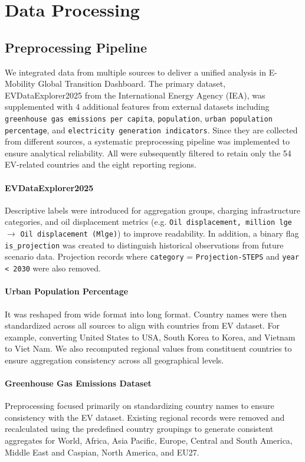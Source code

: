 \documentclass[12pt,conference]{IEEEtran}
\begin{document}
\section{Data Processing}
\subsection{Preprocessing Pipeline}
We integrated data from multiple sources to deliver a unified analysis in E-Mobility Global Transition Dashboard. The primary dataset, EVDataExplorer2025 from the International Energy Agency (IEA), was supplemented with 4 additional features from external datasets including \texttt{greenhouse gas emissions per capita}, \texttt{population}, \texttt{urban population percentage}, and \texttt{electricity generation indicators}. Since they are collected from different sources, a systematic preprocessing pipeline was implemented to ensure analytical reliability. All were subsequently filtered to retain only the 54 EV-related countries and the eight reporting regions.

\paragraph{EVDataExplorer2025 \cite{iea2025evoutlook}} Descriptive labels were introduced for aggregation groups, charging infrastructure categories, and oil displacement metrics (e.g. \texttt{Oil displacement, million lge} $\rightarrow$ \texttt{Oil displacement (Mlge)}) to improve readability. In addition, a binary flag \texttt{is\_projection} was created to distinguish historical observations from future scenario data. Projection records where \texttt{category} = \texttt{Projection-STEPS} and \texttt{year < 2030} were also removed.

\paragraph{Urban Population Percentage \cite{worldbank2025urban}} It was reshaped from wide format into long format. Country names were then standardized across all sources to align with countries from EV dataset. For example, converting United States to USA, South Korea to Korea, and Vietnam to Viet Nam. We also recomputed regional values from constituent countries to ensure aggregation consistency across all geographical levels. 

\paragraph{Greenhouse Gas Emissions Dataset \cite{owid2025ghg}} Preprocessing focused primarily on standardizing country names to ensure consistency with the EV dataset. Existing regional records were removed and recalculated using the predefined country groupings to generate consistent aggregates for World, Africa, Asia Pacific, Europe, Central and South America, Middle East and Caspian, North America, and EU27. 
\end{document}
